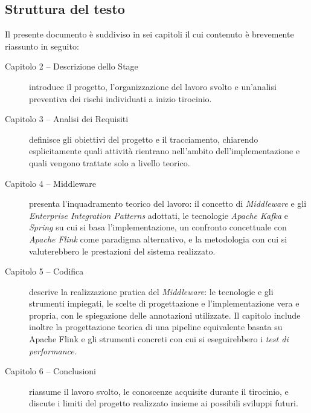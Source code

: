 \subsection{Struttura del testo}
Il presente documento è suddiviso in sei capitoli il cui contenuto è brevemente
riassunto in seguito:
\begin{description}
    \item[Capitolo 2 -- Descrizione dello Stage] introduce il progetto, l'organizzazione del lavoro svolto e un'analisi preventiva dei rischi individuati a inizio tirocinio.

    \item[Capitolo 3 -- Analisi dei Requisiti] definisce gli obiettivi del progetto e il tracciamento, chiarendo esplicitamente quali attività rientrano nell'ambito dell'implementazione e quali vengono trattate solo a livello teorico.

    \item[Capitolo 4 -- Middleware] presenta l'inquadramento teorico del lavoro: il concetto di \textit{Middleware} e gli \textit{Enterprise Integration Patterns} adottati, le tecnologie \textit{Apache Kafka} e \textit{Spring} su cui si basa l'implementazione, un confronto concettuale con \textit{Apache Flink} come paradigma alternativo, e la metodologia con cui si valuterebbero le prestazioni del sistema realizzato.

    \item[Capitolo 5 -- Codifica] descrive la realizzazione pratica del \sloppy\textit{Middleware}: le tecnologie e gli strumenti impiegati, le scelte di progettazione e l'implementazione vera e propria, con le spiegazione delle annotazioni utilizzate. Il capitolo include inoltre la progettazione teorica di una pipeline equivalente basata su Apache Flink e gli strumenti concreti con cui si eseguirebbero i \textit{test di performance}.

    \item[Capitolo 6 -- Conclusioni] riassume il lavoro svolto, le conoscenze acquisite durante il tirocinio, e discute i limiti del progetto realizzato insieme ai possibili sviluppi futuri.
\end{description}

\newpage
